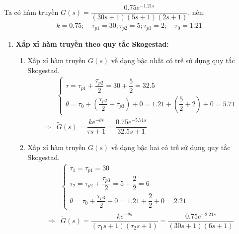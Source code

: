 \begin{solution}
    Ta có hàm truyền $G(s) = \dfrac{0.75e^{-1.21s}}{(30s + 1)(5s + 1)(2s+1)}$, nên:
        \begin{align*}
            k = 0.75; \quad \tau_{p1} = 30; \tau_{p2} = 5; \tau_{p3} = 2; \quad \tau_{0} = 1.21
        \end{align*}
    \begin{enumerate}
        \item \textbf{Xấp xỉ hàm truyền theo quy tắc Skogestad:}
            \begin{enumerate}
                \item Xấp xỉ hàm truyền $G(s)$ về dạng bậc nhất có trễ sử dụng quy tắc Skogestad.
                    \begin{align*}
                        & \left\{\begin{array}{l}
                            \tau = \tau_{p1} + \dfrac{\tau_{p2}}{2} = 30 + \dfrac{5}{2} = 32.5 \\
                            \theta = \tau_0 + \left({\dfrac{\tau_{p2}}{2} + \tau_{p3}}\right) + 0= 1.21 + \left({\dfrac{5}{2} + 2}\right) + 0 = 5.71
                        \end{array}\right. \\
                        \Longrightarrow &
                        \tilde{G}(s) = \dfrac{k e^{-\theta s}}{\tau s + 1} = \dfrac{0.75e^{-5.71s}}{32.5s + 1}
                    \end{align*}
                \item Xấp xỉ hàm truyền $G(s)$ về dạng bậc hai có trễ sử dụng quy tắc Skogestad.
                    \begin{align*}
                        & \left\{\begin{array}{l}
                            \tau_1 = \tau_{p1} = 30\\
                            \tau_2 = \tau_{p2} + \dfrac{\tau_{p3}}{2} = 5 + \dfrac{2}{2} = 6 \\
                            \theta = \tau_0 + \dfrac{\tau_{p3}}{2} + 0 = 1.21 + \dfrac{2}{2} + 0 = 2.21
                        \end{array}\right. \\
                        \Longrightarrow &
                        \tilde{G}(s) = \dfrac{k e^{-\theta s}}{\left({\tau_1 s + 1}\right) \left({\tau_2 s + 1}\right)} = \dfrac{0.75 e^{-2.21s}}{\left({30s + 1}\right) \left({6s + 1}\right)}
                    \end{align*}
            \end{enumerate}


\end{enumerate}
\end{solution}
